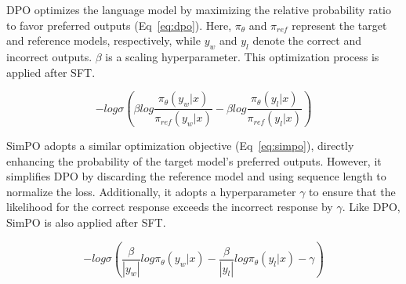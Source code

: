 \documentclass[11pt]{article}
\begin{document}
DPO optimizes the language model by maximizing the relative probability ratio to favor preferred outputs (Eq~\ref{eq:dpo}). Here, $\pi_{\theta}$ and $\pi_{ref}$ represent the target and reference models, respectively, while $y_w$ and $y_l$ denote the correct and incorrect outputs. $\beta$ is a scaling hyperparameter. This optimization process is applied after SFT.

\begin{equation}
\label{eq:dpo}
-log\sigma(\beta log \frac{\pi_{\theta}(y_w|x)}{\pi_{ref}(y_w|x)} - \beta log \frac{\pi_{\theta}(y_l|x)}{\pi_{ref}(y_l|x)} )
\end{equation}


SimPO adopts a similar optimization objective (Eq~\ref{eq:simpo}), directly enhancing the probability of the target model’s preferred outputs. However, it simplifies DPO by discarding the reference model and using sequence length to normalize the loss. Additionally, it adopts a hyperparameter $\gamma$ to ensure that the likelihood for the correct response exceeds the incorrect response by $\gamma$. Like DPO, SimPO is also applied after SFT.

\begin{equation}
\label{eq:simpo}
-log\sigma (\frac{\beta}{|y_w|}log\pi_{\theta} (y_w|x) - \frac{\beta}{|y_l|}log\pi_{\theta} (y_l|x) - \gamma)
\end{equation}

 
\end{document}
